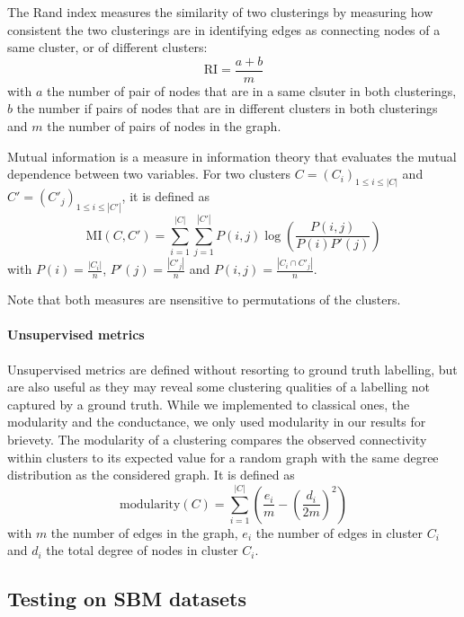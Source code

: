 \documentclass[10pt]{article}
\begin{document}
The Rand index measures the similarity of two clusterings by measuring how consistent the two clusterings are in identifying edges as connecting nodes of a same cluster, or of different clusters:
\begin{equation}
    \mathrm{RI} = \frac{a + b}{m}
\end{equation}
with $a$ the number of pair of nodes that are in a same clsuter in both clusterings, $b$ the number if pairs of nodes that are in different clusters in both clusterings and $m$ the number of pairs of nodes in the graph.

Mutual information is a measure in information theory that evaluates the mutual dependence between two variables. For two clusters $C = (C_i)_{1 \leq i \leq |C|}$ and $C' = (C'_j)_{1 \leq i \leq |C'|}$, it is defined as
\begin{equation}
    \mathrm{MI}(C, C') = \sum_{i=1}^{|C|} \sum_{j=1}^{|C'|} P(i, j) \log\left(\frac{P(i,j)}{P(i)P'(j)}\right)
\end{equation}
with $P(i) = \frac{|C_i|}{n}$, $P'(j) = \frac{|C'_j|}{n}$ and $P(i,j) = \frac{|C_i \cap C'_j|}{n}$.

Note that both measures are nsensitive to permutations of the clusters.

\paragraph{Unsupervised metrics} Unsupervised metrics are defined without resorting to ground truth labelling, but are also useful as they may reveal some clustering qualities of a labelling not captured by a ground truth. While we implemented to classical ones, the modularity and the conductance, we only used modularity in our results for brievety.
The modularity of a clustering compares the observed connectivity within clusters to its expected value for a random graph with the same degree distribution as the considered graph. It is defined as
\begin{equation}
    \mathrm{modularity}(C) = \sum_{i=1}^{|C|} \left(\frac{e_i}{m} - \left(\frac{d_i}{2m}\right)^2 \right)
\end{equation}
with $m$ the number of edges in the graph, $e_i$ the number of edges in cluster $C_i$ and $d_i$ the total degree of nodes in cluster $C_i$.


\subsection{Testing on SBM datasets}
\end{document}
